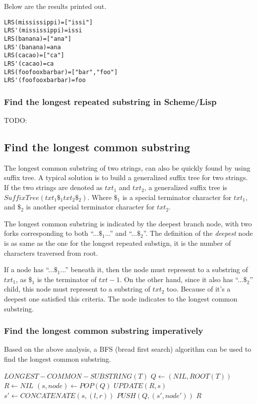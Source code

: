 \documentclass{article}
\begin{document}
Below are the results printed out.

\begin{verbatim}
LRS(mississippi)=["issi"]
LRS'(mississippi)=issi
LRS(banana)=["ana"]
LRS'(banana)=ana
LRS(cacao)=["ca"]
LRS'(cacao)=ca
LRS(foofooxbarbar)=["bar","foo"]
LRS'(foofooxbarbar)=foo
\end{verbatim}

\subsubsection*{Find the longest repeated substring in Scheme/Lisp}
TODO:

\subsection{Find the longest common substring}
The longest common substring of two strings, can also be quickly found
by using suffix tree. A typical solution is to build a generalized suffix
tree for two strings. If the two strings are denoted as $txt_1$ and 
$txt_2$, a generalized suffix tree is $SuffixTree(txt_1\$_1txt_2\$_2)$.
Where $\$_1$ is a special terminator character for $txt_1$, and
$\$_2$ is another special terminator character for $txt_2$.

The longest common substring is indicated by the deepest branch node, with
two forks corresponding to both ``...$\$_1$...'' and ``...$\$_2$''.
The definition of the {\em deepest} node is as same as the one for 
the longest repeated substign, it is the number of characters traversed
from root. 

If a node has ``...$\$_1$...'' beneath it, then the node must represent
to a substring of $txt_1$, as $\$_1$ is the terminator of $txt-1$. 
On the other hand, since it also has ``...$\$_2$'' child, this node 
must represent to a substring of $txt_2$ too. Because of it's a deepest
one satisfied this criteria. The node indicates to the longest common
substring.

\subsubsection{Find the longest common substring imperatively}
Based on the above analysis, a BFS (bread first search) algorithm 
can be used to find the longest common substring.

\begin{algorithmic}
\STATE $LONGEST-COMMON-SUBSTRING(T)$
  \STATE $Q \leftarrow (NIL, ROOT(T))$
  \STATE $R \leftarrow NIL$
    \STATE $(s, node) \leftarrow POP(Q)$
      \STATE $UPDATE(R, s)$
    \ENDIF
        \STATE $s' \leftarrow CONCATENATE(s, (l, r))$
        \STATE $PUSH(Q, (s', node'))$
      \ENDIF
    \ENDFOR
  \ENDWHILE
  \RETURN $R$
\end{algorithmic}
\end{document}
